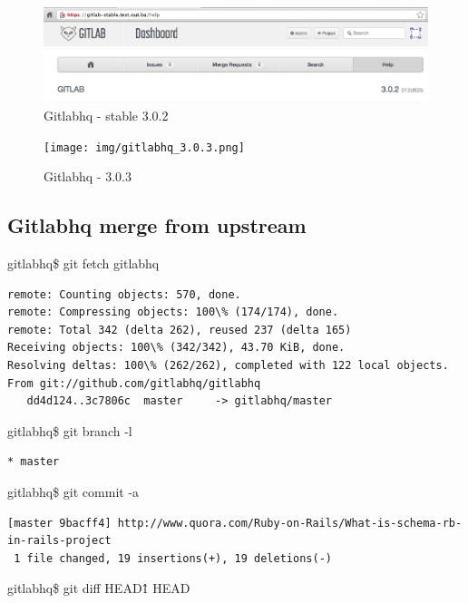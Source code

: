 \documentclass[times, utf8, seminar]{fit}
\begin{document}
\begin{figure}[H]
\centering
\includegraphics[width=15cm]{img/gitlab_stable_3.0.2.png}
\caption{Gitlabhq - stable 3.0.2}
\end{figure}


\begin{figure}[H]
\centering
\texttt{[image: img/gitlabhq\_3.0.3.png]}
\caption{Gitlabhq - 3.0.3}
\end{figure}



\subsection{Gitlabhq merge from upstream}

gitlabhq\$ git fetch gitlabhq

\begin{lstlisting}
remote: Counting objects: 570, done.
remote: Compressing objects: 100\% (174/174), done.
remote: Total 342 (delta 262), reused 237 (delta 165)
Receiving objects: 100\% (342/342), 43.70 KiB, done.
Resolving deltas: 100\% (262/262), completed with 122 local objects.
From git://github.com/gitlabhq/gitlabhq
   dd4d124..3c7806c  master     -> gitlabhq/master
\end{lstlisting}


gitlabhq\$ git branch -l

\begin{lstlisting}
* master
\end{lstlisting}


gitlabhq\$ git commit -a

\begin{lstlisting}
[master 9bacff4] http://www.quora.com/Ruby-on-Rails/What-is-schema-rb-in-rails-project
 1 file changed, 19 insertions(+), 19 deletions(-)
\end{lstlisting}



gitlabhq\$ git diff HEAD\^1 HEAD
\end{document}
